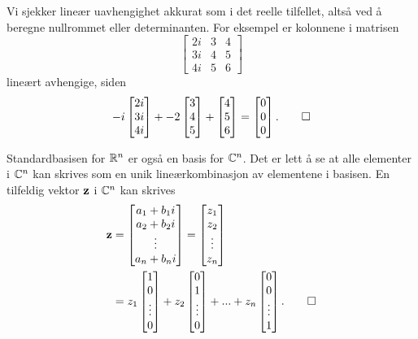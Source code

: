 \begin{ex}
Vi sjekker lineær uavhengighet akkurat som i det reelle tilfellet, altså ved å beregne nullrommet eller determinanten. For eksempel er kolonnene i matrisen 
\[
\begin{bmatrix}
2i & 3 & 4 \\ 3i & 4 & 5 \\ 4i &  5 &6  
\end{bmatrix}
\]
lineært avhengige, siden 
\[
-i
\begin{bmatrix}
2i  \\ 3i \\ 4i 
\end{bmatrix}
+
-2
\begin{bmatrix}
 3 \\  4  \\   5 
\end{bmatrix}
+
\begin{bmatrix}
 4 \\ 5 \\  6  
\end{bmatrix}
=
\begin{bmatrix}
0 \\ 0 \\ 0
\end{bmatrix}. \qedhere
\]
\end{ex}

\begin{ex}
Standardbasisen for $\mathbb{R}^n$ er også en basis for $\mathbb{C}^n$. 
Det er lett å se at alle elementer i $\mathbb{C}^n$ kan skrives som en unik lineærkombinasjon av elementene i basisen. 
En tilfeldig vektor $\mathbf{z}$ i $\mathbb{C}^n$ kan skrives
\begin{align*}
\mathbf{z}&=
\begin{bmatrix}
a_1+b_1 i    \\ a_2+b_2 i   \\ \vdots \\ a_n+b_n i 
\end{bmatrix}
=
\begin{bmatrix}
z_1    \\ z_2   \\ \vdots \\ z_n
\end{bmatrix}
\\&=
z_1
\begin{bmatrix}
1    \\ 0  \\ \vdots \\ 0
\end{bmatrix}
+
z_2
\begin{bmatrix}
0    \\ 1  \\ \vdots \\ 0
\end{bmatrix}
+...+
z_n
\begin{bmatrix}
0    \\ 0  \\ \vdots \\ 1
\end{bmatrix}. \qedhere
\end{align*}
\end{ex}

